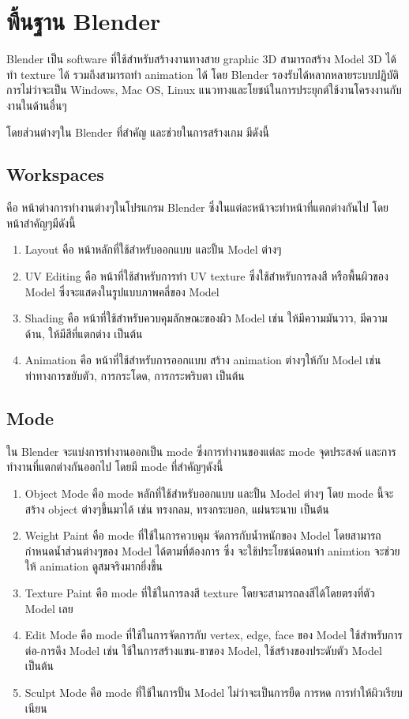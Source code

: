 \section{พื้นฐาน Blender}
\enskip \enskip \enskip \enskip \enskip Blender เป็น software ที่ใช้สำหรับสร้างงานทางสาย graphic 3D สามารถสร้าง Model 3D 
ได้ ทำ texture ได้ รวมถึงสามารถทำ animation ได้ โดย Blender รองรับได้หลากหลายระบบปฏิบัติการไม่ว่าจะเป็น Windows, Mac OS, Linux แนวทางและโยชน์ในการประยุกต์ใช้งานโครงงานกับงานในด้านอื่นๆ

\enskip \enskip โดยส่วนต่างๆใน Blender ที่สำคัญ และช่วยในการสร้างเกม มีดังนี้
\subsection{Workspaces}
คือ หน้าต่างการทำงานต่างๆในโปรแกรม Blender ซึ่งในแต่ละหน้าจะทำหน้าที่แตกต่างกันไป โดยหน้าสำคัญๆมีดังนี้
\begin{enumerate}
\item Layout คือ หน้าหลักที่ใช้สำหรับออกแบบ และปั้น Model ต่างๆ
\item UV Editing คือ หน้าที่ใช้สำหรับการทำ UV texture ซึ่งใช้สำหรับการลงสี หรือพื้นผิวของ Model ซึ่งจะแสดงในรูปแบบภาพคลี่ของ Model
\item Shading คือ หน้าที่ใช้สำหรับควบคุมลักษณะของผิว Model เช่น ให้มีความมันวาว, มีความด้าน, ให้มีสีที่แตกต่าง เป็นต้น
\item Animation คือ หน้าที่ใช้สำหรับการออกแบบ สร้าง animation ต่างๆให้กับ Model เช่น ท่าทางการขยับตัว, การกระโดด, การกระพริบตา เป็นต้น
\end{enumerate}
\subsection{Mode}
ใน Blender จะแบ่งการทำงานออกเป็น mode ซึ่งการทำงานของแต่ละ mode จุดประสงค์ และการทำงานที่แตกต่างกันออกไป โดยมี mode ที่สำคัญๆดังนี้
\begin{enumerate}
\item Object Mode คือ mode หลักที่ใช้สำหรับออกแบบ และปั้น Model ต่างๆ โดย mode นี้จะสร้าง object ต่างๆขึ้นมาได้ เช่น 
ทรงกลม, ทรงกระบอก, แผ่นระนาบ เป็นต้น
\item Weight Paint คือ mode ที่ใช้ในการควบคุม จัดการกับน้ำหนักของ Model โดยสามารถกำหนดน้ำส่วนต่างๆของ Model ได้ตามที่ต้องการ 
ซึ่ง จะใช้ประโยชน์ตอนทำ animtion จะช่วยให้ animation ดูสมจริงมากยิ่งขึ้น
\item Texture Paint คือ mode ที่ใช้ในการลงสี texture โดยจะสามารถลงสีได้โดยตรงที่ตัว Model เลย
\item Edit Mode คือ mode ที่ใช้ในการจัดการกับ vertex, edge, face ของ Model ใช้สำหรับการต่อ-การดึง Model เช่น 
ใช้ในการสร้างแขน-ขาของ Model, ใช้สร้างของประดับตัว Model เป็นต้น
\item Sculpt Mode คือ mode ที่ใช้ในการปั้น Model ไม่ว่าจะเป็นการยืด การหด การทำให้ผิวเรียบเนียน
\end{enumerate}

